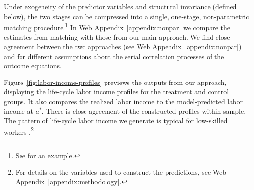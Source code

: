 Under exogeneity of the predictor variables and structural invariance (defined below), the two stages can be compressed into a single, one-stage, non-parametric matching procedure.\footnote{See \citet{Heckman_Ichimura_etal_1998_Econometrica} for an example.} In Web Appendix~\ref{appendix:nonpar} we compare the estimates from matching with those from our main approach. We find close agreement between the two approaches (see Web Appendix~\ref{appendix:nonpar}) and for different assumptions about the serial correlation processes of the outcome equations.

Figure~\ref{fig:labor-income-profiles} previews the outputs from our approach, displaying the life-cycle labor income profiles for the treatment and control groups. It also compares the realized labor income to the model-predicted labor income at $a^*$. There is close agreement of the constructed profiles within sample. The pattern of life-cycle labor income we generate is typical for low-skilled workers \citep{Blundell-etal_2015_J-Pub-E,Gladden_Taber_2000_WageProgression,Sanders-Taber_2012_AR,Lagakos_Moll_etal_2016_LifeCycle_NBER}.\footnote{For details on the variables used to construct the predictions, see Web Appendix~\ref{appendix:methodology}.}

